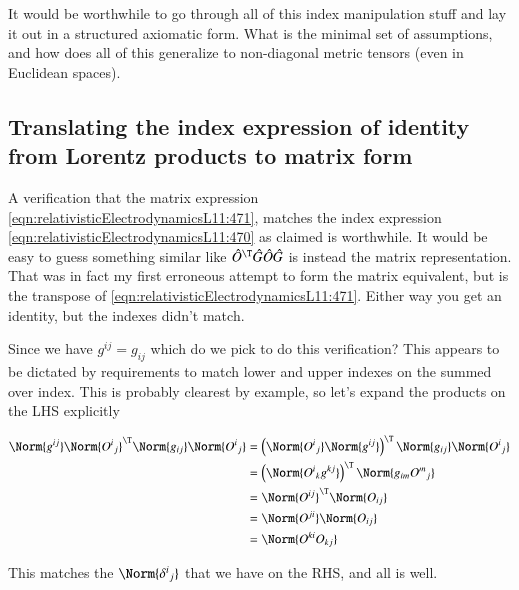 It would be worthwhile to go through all of this index manipulation stuff and lay it out in a structured axiomatic form.  What is the minimal set of assumptions, and how does all of this generalize to non-diagonal metric tensors (even in Euclidean spaces).

\subsection{Translating the index expression of identity from Lorentz products to matrix form}

A verification that the matrix expression \ref{eqn:relativisticElectrodynamicsL11:471}, matches the index expression \ref{eqn:relativisticElectrodynamicsL11:470} as claimed is worthwhile.  It would be easy to guess something similar like $\hat{O}^\T \hat{G} \hat{O} \hat{G}$ is instead the matrix representation.  That was in fact my first erroneous attempt to form the matrix equivalent, but is the transpose of \ref{eqn:relativisticElectrodynamicsL11:471}.  Either way you get an identity, but the indexes didn't match.

Since we have $g^{i j} = g_{i j}$ which do we pick to do this verification?  This appears to be dictated by requirements to match lower and upper indexes on the summed over index.  This is probably clearest by example, so let's expand the products on the LHS explicitly

\begin{align*}
\Norm{ g^{i j} } 
\Norm{ {O^{i}}_j } ^\T
\Norm{ g_{i j} }
\Norm{ {O^{i}}_j } 
&=
\left( \Norm{ {O^{i}}_j } 
\Norm{ g^{i j} } \right) ^\T
\Norm{ g_{i j} }
\Norm{ {O^{i}}_j }  \\
&=
\left( \Norm{ {O^{i}}_k g^{k j} } \right) ^\T
\Norm{ g_{i m} {O^{m}}_j }  \\
&=
\Norm{ O^{i j} } ^\T
\Norm{ O_{i j} }  \\
&=
\Norm{ O^{j i} } 
\Norm{ O_{i j} }  \\
&=
\Norm{ O^{k i} O_{k j} }  \\
\end{align*}

This matches the $\Norm{{\delta^i}_j}$ that we have on the RHS, and all is well.

\EndArticle
